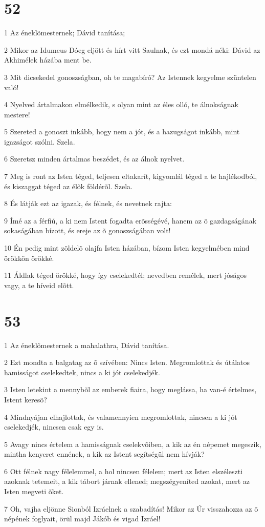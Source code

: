 \chapter{52}

\par 1 Az éneklõmesternek; Dávid tanítása;
\par 2 Mikor az Idumeus Dóeg eljött és hírt vitt Saulnak, és ezt mondá néki: Dávid az Akhimélek házába ment be.
\par 3 Mit dicsekedel gonoszságban, oh te magabíró? Az Istennek kegyelme szüntelen való!
\par 4 Nyelved ártalmakon elmélkedik, s olyan mint az éles olló, te álnokságnak mestere!
\par 5 Szereted a gonoszt inkább, hogy nem a jót, és a hazugságot inkább, mint igazságot szólni. Szela.
\par 6 Szeretsz minden ártalmas beszédet, és az álnok nyelvet.
\par 7 Meg is ront az Isten téged, teljesen eltakarít, kigyomlál téged a te hajlékodból, és kiszaggat téged az élõk földérõl. Szela.
\par 8 És látják ezt az igazak, és félnek, és nevetnek rajta:
\par 9 Ímé az a férfiú, a ki nem Istent fogadta erõsségévé, hanem az õ gazdagságának sokaságában bízott, és ereje az õ gonoszságában volt!
\par 10 Én pedig mint zöldelõ olajfa Isten házában, bízom Isten kegyelmében mind örökkön örökké.
\par 11 Áldlak téged örökké, hogy így cselekedtél; nevedben remélek, mert jóságos vagy, a te híveid elõtt.

\chapter{53}

\par 1 Az éneklõmesternek a mahalathra, Dávid tanítása.
\par 2 Ezt mondta a balgatag az õ szívében: Nincs Isten. Megromlottak és útálatos hamisságot cselekedtek, nincs a ki jót cselekedjék.
\par 3 Isten letekint a mennybõl az emberek fiaira, hogy meglássa, ha van-é értelmes, Istent keresõ?
\par 4 Mindnyájan elhajlottak, és valamennyien megromlottak, nincsen a ki jót cselekedjék, nincsen csak egy is.
\par 5 Avagy nincs értelem a hamisságnak cselekvõiben, a kik az én népemet megeszik, mintha kenyeret ennének, a kik az Istent segítségül nem hívják?
\par 6 Ott félnek nagy félelemmel, a hol nincsen félelem; mert az Isten elszéleszti azoknak tetemeit, a kik tábort járnak ellened; megszégyeníted azokat, mert az Isten megveti õket.
\par 7 Oh, vajha eljönne Sionból Izráelnek a szabadítás! Mikor az Úr visszahozza az õ népének foglyait, örül majd Jákób és vigad Izráel!

